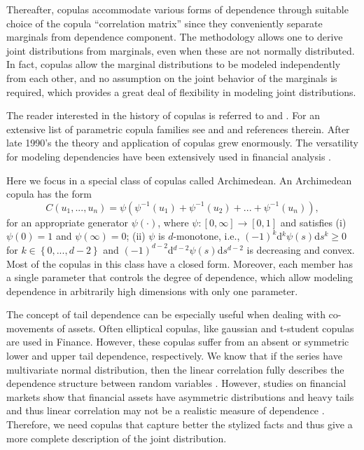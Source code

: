\documentclass[a4paper,10pt]{article}
\begin{document}
Thereafter, copulas accommodate various forms of dependence through suitable choice of the copula ``correlation matrix'' since they conveniently separate marginals from dependence component. The methodology allows one to derive joint distributions from marginals, even when these are not normally distributed. In fact, copulas allow the marginal distributions to be modeled independently from each other, and no assumption on the joint behavior of the marginals is required, which provides a great deal of flexibility in modeling joint distributions.

\bigskip

The reader interested in the history of copulas is referred to \citet*{%
	schweizer2011} and \citet*{nelsen06}. For an extensive list of parametric
copula families see \citet*{joe97} and \citet*{nelsen06} and references
therein. After late 1990's the theory and application of copulas grew
enormously. The versatility for modeling dependencies have been extensively used in financial analysis \citep{cherubini04,patton2006,chan2010,sak2010,laih2014,d2017}. 

Here we focus in a special class of copulas called Archimedean. An
Archimedean copula has the form
\begin{equation}
C\left( u_{1},...,u_{n}\right) =\psi \left( \psi ^{-1}\left( u_{1}\right)
+\psi ^{-1}\left( u_{2}\right) +...+\psi ^{-1}\left( u_{n}\right) \right) ,
\end{equation}%
for an appropriate generator $\psi \left( \cdot \right) $, where $\psi :%
\left[ 0,\infty \right] \rightarrow \left[ 0,1\right] $ and satisfies (i) $%
\psi (0)=1$ and $\psi (\infty )=0$; (ii) $\psi $ is $d$-monotone, i.e., $%
(-1)^{k}$d$^{k}\psi \left( s\right) $d$s^{k}\geq 0$ for $k\in \left\{
0,...,d-2\right\} $ and $(-1)^{d-2}$d$^{d-2}\psi \left( s\right) $d$s^{d-2}$
is decreasing and convex. Most of the copulas in this class have a closed
form. Moreover, each member has a single parameter that controls the degree
of dependence, which allow modeling dependence in arbitrarily high
dimensions with only one parameter.

The concept of tail dependence can be especially useful when dealing with co-movements of assets. Often elliptical copulas, like gaussian and t-student copulas are used in Finance. However, these copulas suffer from an absent or symmetric lower and upper tail dependence, respectively. We know that if the series have multivariate normal distribution, then the linear correlation fully describes the dependence structure between random variables \citep{embrechts2001}. However, studies on financial markets show that financial assets have asymmetric distributions and heavy tails and thus linear correlation may not be a realistic measure of dependence \citep{campbell97,artzner1999,cont01,ane03,szego2005,mcneil15}. Therefore, we need copulas that capture better the
stylized facts and thus give a more complete description of the joint
distribution.
\end{document}
